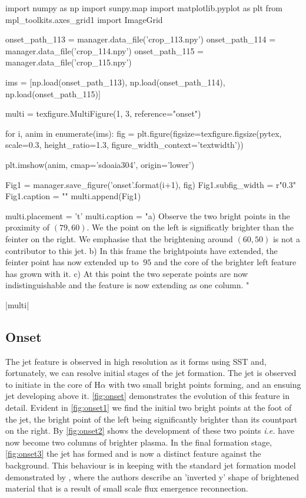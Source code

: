 \documentclass{emulateapj}
\begin{document}
\begin{pycode}[Onset]
import numpy as np
import sunpy.map
import matplotlib.pyplot as plt
from mpl_toolkits.axes_grid1 import ImageGrid

onset_path_113 = manager.data_file('crop_113.npy')
onset_path_114 = manager.data_file('crop_114.npy')
onset_path_115 = manager.data_file('crop_115.npy')

ims = [np.load(onset_path_113), np.load(onset_path_114), np.load(onset_path_115)]


multi = texfigure.MultiFigure(1, 3, reference="onset")

for i, anim in enumerate(ims):
	fig = plt.figure(figsize=texfigure.figsize(pytex, scale=0.3, height_ratio=1.3, figure_width_context='textwidth'))
	
	plt.imshow(anim, cmap='sdoaia304', origin='lower')
	
	Fig1 = manager.save_figure('onset{}'.format(i+1), fig)
	Fig1.subfig_width = r"0.3\textwidth"
	Fig1.caption = ""
	multi.append(Fig1)

multi.placement = 't'
multi.caption = "a) Observe the two bright points in the proximity of $(79, 60)$. We the point on the left is significatly brighter than the feinter on the right. We emphasise that the brightening around $(60, 50)$ is not a contributor to this jet. b) In this frame the brightpoints have extended, the feinter point has now extended up to $~95$ and the core of the brighter left feature has grown with it. c) At this point the two seperate points are now indistinguishable and the feature is now extending as one column. "
\end{pycode}

\py[Onset]|multi|


\subsection{Onset}
The jet feature is observed in high resolution as it forms using SST and, fortunately, we can resolve initial stages of the jet formation.
The jet is observed to initiate in the core of H$\alpha$ with two small bright points forming, and an ensuing jet developing above it. 
\cref{fig:onset} demonstrates the evolution of this feature in detail.
Evident in \cref{fig:onset1} we find the initial two bright points at the foot of the jet, the bright point of the left being significantly brighter than its countpart on the right.
By \cref{fig:onset2} shows the development of these two points \emph{i.e.} have now become two columns of brighter plasma.
In the final formation stage, \cref{fig:onset3} the jet has formed and is now a distinct feature against the background.
This behaviour is in keeping with the standard jet formation model demonstrated by \cite{Shibata1992}, where the authors describe an 'inverted y' shape of brightened material that is a result of small scale flux emergence reconnection.
\end{document}
